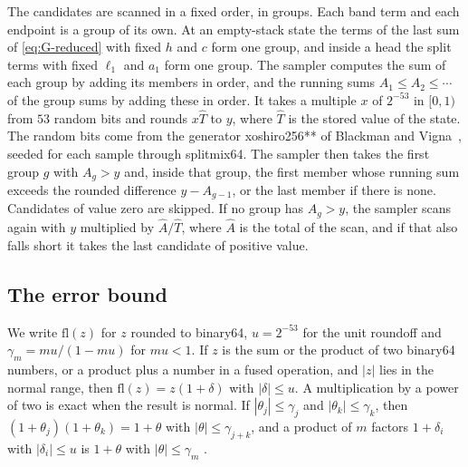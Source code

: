 \documentclass[11pt,reqno]{amsart}
\theoremstyle{definition}
\theoremstyle{remark}
\begin{document}
The candidates are scanned in a fixed order, in groups.  Each band term and
each endpoint is a group of its own.  At an empty-stack state the terms of
the last sum of \eqref{eq:G-reduced} with fixed $h$ and $c$ form one group,
and inside a head the split terms with fixed $\ell_1$ and $a_1$ form one
group.  The sampler computes the sum of each group by adding its members in
order, and the running sums $A_1\leq A_2\leq\cdots$ of the group sums by
adding these in order.  It takes a multiple $x$ of $2^{-53}$ in $[0,1)$ from
$53$ random bits and rounds $x\hat T$ to $y$, where $\hat T$ is the stored
value of the state.  The random bits come from the generator xoshiro256**
of Blackman and Vigna~\cite{BlackmanVigna2021}, seeded for each sample
through splitmix64.  The sampler then takes the first group $g$ with
$A_g>y$ and,
inside that group, the first member whose running sum exceeds the rounded
difference $y-A_{g-1}$, or the last member if there is none.  Candidates of
value zero are skipped.  If no group has $A_g>y$, the sampler scans again
with $y$ multiplied by $\hat A/\hat T$, where $\hat A$ is the total of the
scan, and if
that also falls short it takes the last candidate of positive value.

\subsection{The error bound}\label{app:float-bound}

We write $\mathrm{fl}(z)$ for $z$ rounded to binary64, $u=2^{-53}$ for the
unit roundoff and $\gamma_m=mu/(1-mu)$ for $mu<1$.  If $z$ is the sum or the
product of two binary64 numbers, or a product plus a number in a fused
operation, and $|z|$ lies in the normal range, then
$\mathrm{fl}(z)=z(1+\delta)$ with $|\delta|\leq u$.  A multiplication by a
power of two is exact when the result is normal.  If $|\theta_j|\leq\gamma_j$
and $|\theta_k|\leq\gamma_k$, then $(1+\theta_j)(1+\theta_k)=1+\theta$ with
$|\theta|\leq\gamma_{j+k}$, and a product of $m$ factors $1+\delta_i$ with
$|\delta_i|\leq u$ is $1+\theta$ with $|\theta|\leq\gamma_m$
\cite[Lemmas~3.1 and~3.3]{Higham2002}.
\end{document}
